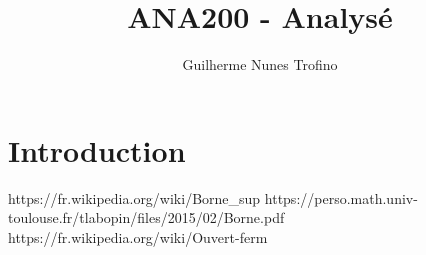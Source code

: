 \documentclass{article}
\title{ANA200 - Analysé}
\author{Guilherme Nunes Trofino}
\begin{document}
\maketitle

\newpage\tableofcontents

\section{Introduction}
https://fr.wikipedia.org/wiki/Borne_sup%
https://perso.math.univ-toulouse.fr/tlabopin/files/2015/02/Borne.pdf
https://fr.wikipedia.org/wiki/Ouvert-ferm%
\end{document}

